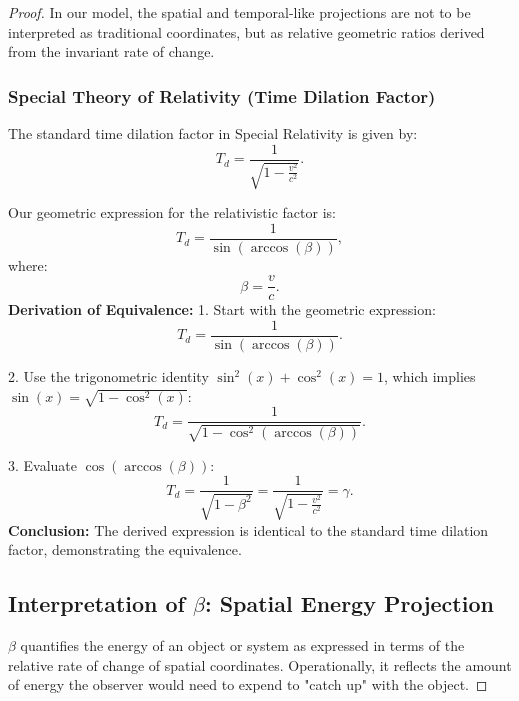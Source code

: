 \documentclass{article}
\begin{document}
\begin{theorem}
\begin{proof}
In our model, the spatial and temporal-like projections are not to be interpreted as traditional coordinates, but as relative geometric ratios derived from the invariant rate of change. 

\subsubsection{Special Theory of Relativity (Time Dilation Factor)}

The standard time dilation factor in Special Relativity is given by:
\begin{equation}
T_d = \frac{1}{\sqrt{1 - \frac{v^2}{c^2}}}.
\end{equation}

Our geometric expression for the relativistic factor is:
\begin{equation}
T_d = \frac{1}{\sin(\arccos(\beta))},
\end{equation}
where:
\begin{equation}
\beta = \frac{v}{c}.
\end{equation}
\textbf{Derivation of Equivalence:}
1. Start with the geometric expression:
\begin{equation}
T_d = \frac{1}{\sin(\arccos(\beta))}.
\end{equation}

2. Use the trigonometric identity \(\sin^2(x) + \cos^2(x) = 1\), which implies \(\sin(x) = \sqrt{1 - \cos^2(x)}\):
\begin{equation}
T_d = \frac{1}{\sqrt{1 - \cos^2(\arccos(\beta))}}.
\end{equation}

3. Evaluate \(\cos(\arccos(\beta))\):
\begin{equation}
T_d = \frac{1}{\sqrt{1 - \beta^2}}= \frac{1}{\sqrt{1 - \frac{v^2}{c^2}}}=\gamma.
\end{equation}
\textbf{Conclusion:} The derived expression is identical to the standard time dilation factor, demonstrating the equivalence.

\subsection{Interpretation of \(\beta\): Spatial Energy Projection}

$\beta$ quantifies the energy of an object or system as expressed in terms of the relative rate of change of spatial coordinates. Operationally, it reflects the amount of energy the observer would need to expend to "catch up" with the object.


\end{proof}
\end{theorem}
\end{document}
